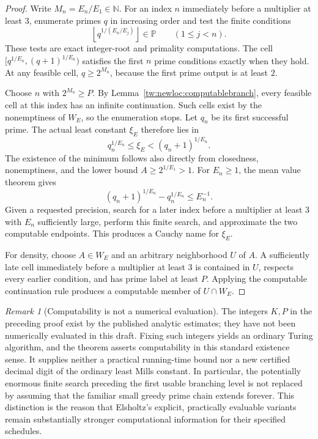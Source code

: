 \documentclass[11pt,a4paper]{article}
\theoremstyle{definition}
\theoremstyle{remark}
\newtheorem{remark}[theorem]{Remark}
\numberwithin{equation}{section}
\begin{document}
\begin{proof}
Write $M_n=E_n/E_1\in\mathbb N$. For an index $n$ immediately before a
multiplier at least $3$, enumerate primes $q$ in increasing order and
test the finite conditions
\[
 \left\lfloor q^{1/(E_n/E_j)}\right\rfloor\in\mathbb P
       \qquad(1\le j<n).
\]
These tests are exact integer-root and primality computations. The cell
$[q^{1/E_n},(q+1)^{1/E_n})$ satisfies the first $n$ prime conditions
exactly when they hold. At any feasible cell, $q\ge2^{M_n}$, because the
first prime output is at least $2$.

Choose $n$ with $2^{M_n}\ge P$. By
Lemma~\ref{tw:newloc:computablebranch}, every feasible cell at this index
has an infinite continuation. Such cells exist by the nonemptiness
of $W_E$, so the enumeration stops. Let $q_n$ be its first successful
prime. The actual least constant $\xi_E$ therefore lies in
\[
 q_n^{1/E_n}\le\xi_E<(q_n+1)^{1/E_n}.
\]
The existence of the minimum follows also directly from closedness,
nonemptiness, and the lower bound $A\ge2^{1/E_1}>1$.
For $E_n\ge1$, the mean value theorem gives
\[
 (q_n+1)^{1/E_n}-q_n^{1/E_n}\le E_n^{-1}.
\]
Given a requested precision, search for a later index before a multiplier
at least $3$ with $E_n$ sufficiently large, perform this finite search,
and approximate the two computable endpoints. This produces a Cauchy
name for $\xi_E$.

For density, choose $A\in W_E$ and an arbitrary neighborhood $U$ of $A$.
A sufficiently late cell immediately before a multiplier at least $3$
is contained in $U$, respects every earlier condition, and has prime
label at least $P$. Applying the computable continuation rule produces
a computable member of $U\cap W_E$.
\end{proof}

\begin{remark}[Computability is not a numerical evaluation]
The integers $K,P$ in the preceding proof exist by the published analytic
estimates; they have not been numerically evaluated in this draft.
Fixing such integers yields an ordinary Turing algorithm, and the theorem
asserts computability in this standard existence sense. It supplies
neither a practical running-time bound nor a new certified decimal digit
of the ordinary least Mills constant. In particular, the potentially
enormous finite search preceding the first usable branching level is
not replaced by assuming that the familiar small greedy prime chain
extends forever. This distinction is the reason that Elsholtz's explicit,
practically evaluable variants \cite{Elsholtz2020} remain substantially stronger computational
information for their specified schedules.
\end{remark}
\end{document}
